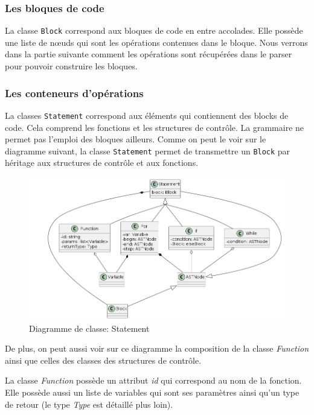 \documentclass[a4paper]{article}%
\begin{document}
\subsubsection*{Les bloques de code}

La classe \lstinline{Block} correspond aux bloques de code en entre accolades.
Elle possède une liste de nœuds qui sont les opérations contenues dans le
bloque. Nous verrons dans la partie suivante comment les opérations sont
récupérées dans le \gls{parser} pour pouvoir construire les bloques.

\clearpage{}
\subsubsection*{Les conteneurs d'opérations}

La classes \lstinline{Statement} correspond aux éléments qui contiennent des
blocks de code. Cela comprend les fonctions et les structures de contrôle. La
grammaire ne permet pas l'emploi des bloques ailleurs. Comme on peut le voir sur
le diagramme suivant, la classe \lstinline{Statement} permet de transmettre un
\lstinline{Block} par héritage aux structures de contrôle et aux fonctions.

\begin{figure}[h!]
  \begin{center}
  \includegraphics[scale=0.5]{../ressources/diagrams/stmts.png}
  \caption{Diagramme de classe: Statement}
  \end{center}
\end{figure}

De plus, on peut aussi voir sur ce diagramme la composition de la classe
\textit{Function} ainsi que celles des classes des structures de contrôle.

La classe \textit{Function} possède un attribut \textit{id} qui correspond au nom de la
fonction. Elle possède aussi un liste de variables qui sont ses paramètres ainsi
qu'un type de retour (le type \textit{Type} est détaillé plus loin).
\end{document}
